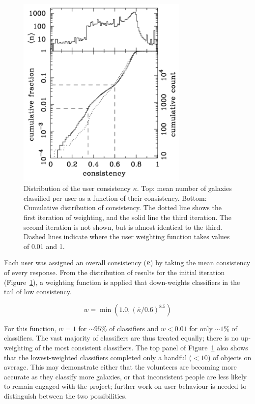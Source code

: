 \documentclass[useAMS,usenatbib]{mn2e}
\providecommand{\DIFdelbegin}{} %
\providecommand{\DIFdelend}{} %
\begin{document}
\begin{figure}
\includegraphics[angle=0,width=3.3in]{figures/user_consistency.pdf}
\caption{Distribution of the user consistency $\kappa$. Top: mean number of galaxies classified per user as a function of their consistency. Bottom: Cumulative distribution of consistency. The dotted line shows the first iteration of weighting, and the solid line the third iteration. The second iteration is not shown, but is almost identical to the third. Dashed lines indicate where the user weighting function takes values of 0.01 and 1. 
\label{fig-consistency}}
\end{figure}

Each user was assigned an overall consistency ($\bar{\kappa}$) by taking the mean consistency of every response. From the distribution of results for the initial iteration (Figure~\ref{fig-consistency}), a weighting function is applied that down-weights classifiers in the tail of low consistency.
\DIFdelbegin %

\DIFdelend \begin{equation}
w = \min \left(1.0,(\bar{\kappa} / 0.6)^{8.5} \right)
\label{eqn-weight}
\end{equation}
\DIFdelbegin %

\DIFdelend For this function, $w=1$ for $\sim95\%$ of classifiers and $w<0.01$ for only $\sim1\%$ of classifiers. The vast majority of classifiers are thus treated equally; there is no up-weighting of the most consistent classifiers. The top panel of Figure~\ref{fig-consistency} also shows that the lowest-weighted classifiers completed only a handful ($<10$) of objects on average. This may demonstrate either that the volunteers are becoming more accurate as they classify more galaxies, or that inconsistent people are less likely to remain engaged with the project; further work on user behaviour is needed to distinguish between the two possibilities.
\end{document}
